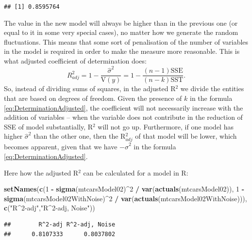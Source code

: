 \documentclass[
]{book}
\newenvironment{Shaded}{\begin{snugshade}}{\end{snugshade}}
\newcommand{\DecValTok}[1]{\textcolor[rgb]{0.00,0.00,0.81}{#1}}
\newcommand{\KeywordTok}[1]{\textcolor[rgb]{0.13,0.29,0.53}{\textbf{#1}}}
\newcommand{\NormalTok}[1]{#1}
\newcommand{\OperatorTok}[1]{\textcolor[rgb]{0.81,0.36,0.00}{\textbf{#1}}}
\newcommand{\StringTok}[1]{\textcolor[rgb]{0.31,0.60,0.02}{#1}}
\theoremstyle{definition}
\theoremstyle{definition}
\theoremstyle{definition}
\theoremstyle{definition}
\theoremstyle{remark}
\begin{document}
\begin{verbatim}
## [1] 0.8595764
\end{verbatim}

The value in the new model will always be higher than in the previous one (or equal to it in some very special cases), no matter how we generate the random fluctuations. This means that some sort of penalisation of the number of variables in the model is required in order to make the measure more reasonable. This is what adjusted coefficient of determination does:
\begin{equation}
    R^2_{adj} = 1 - \frac{\hat{\sigma}^2}{\mathrm{V}(y)} = 1 - \frac{(n-1)\mathrm{SSE}}{(n-k)\mathrm{SST}} .
    \label{eq:DeterminationAdjusted}
\end{equation}
So, instead of dividing sums of squares, in the adjusted R\(^2\) we divide the entities that are based on degrees of freedom. Given the presence of \(k\) in the formula \eqref{eq:DeterminationAdjusted}, the coefficient will not necessarily increase with the addition of variables -- when the variable does not contribute in the reduction of SSE of model substantially, R\(^2\) will not go up. Furthermore, if one model has higher \(\hat{\sigma}^2\) than the other one, then the R\(^2_{adj}\) of that model will be lower, which becomes apparent, given that we have \(-\hat{\sigma}^2\) in the formula \eqref{eq:DeterminationAdjusted}.

Here how the adjusted R\(^2\) can be calculated for a model in R:

\begin{Shaded}
\begin{Highlighting}[]
\KeywordTok{setNames}\NormalTok{(}\KeywordTok{c}\NormalTok{(}\DecValTok{1} \OperatorTok{{-}}\StringTok{ }\KeywordTok{sigma}\NormalTok{(mtcarsModel02)}\OperatorTok{\^{}}\DecValTok{2} \OperatorTok{/}\StringTok{ }\KeywordTok{var}\NormalTok{(}\KeywordTok{actuals}\NormalTok{(mtcarsModel02)),}
           \DecValTok{1} \OperatorTok{{-}}\StringTok{ }\KeywordTok{sigma}\NormalTok{(mtcarsModel02WithNoise)}\OperatorTok{\^{}}\DecValTok{2} \OperatorTok{/}\StringTok{ }\KeywordTok{var}\NormalTok{(}\KeywordTok{actuals}\NormalTok{(mtcarsModel02WithNoise))),}
         \KeywordTok{c}\NormalTok{(}\StringTok{"R\^{}2{-}adj"}\NormalTok{,}\StringTok{"R\^{}2{-}adj, Noise"}\NormalTok{))}
\end{Highlighting}
\end{Shaded}

\begin{verbatim}
##        R^2-adj R^2-adj, Noise 
##      0.8107333      0.8037802
\end{verbatim}
\end{document}
